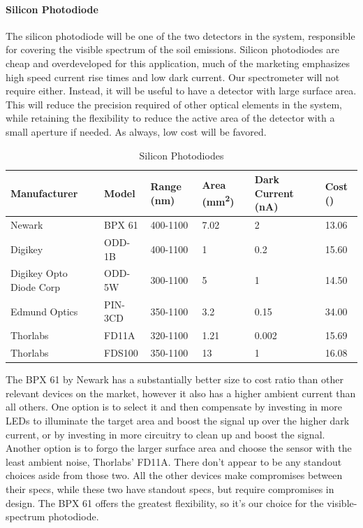 	\paragraph{Silicon Photodiode}

	The silicon photodiode will be one of the two detectors in the system, responsible for covering the visible spectrum of the soil emissions. Silicon photodiodes are cheap and overdeveloped for this application, much of the marketing emphasizes high speed current rise times and low dark current. Our spectrometer will not require either. Instead, it will be useful to have a detector with large surface area. This will reduce the precision required of other optical elements in the system, while retaining the flexibility to reduce the active area of the detector with a small aperture if needed. As always, low cost will be favored.


\begin{table}[H]
	\centering
	\label{table:SiliconPhotodiodes}
	\caption{Silicon Photodiodes}
	\bigskip
	\begin{tabular}{|p{2.5cm}|p{2cm}|p{2cm}|p{1.5cm}|p{1.5cm}|p{1.5cm}|}
	\hline
	Manufacturer & Model & Range (nm) & Area (mm\textsuperscript{2}) & Dark Current (nA) & Cost (\textdollar)\\
    \hline
	Newark & BPX 61 & 400-1100 & 7.02 & 2 & 13.06\\
    \hline
	Digikey & ODD-1B & 400-1100 & 1 & 0.2 & 15.60\\
    \hline
	Digikey Opto Diode Corp & ODD-5W & 300-1100 & 5 & 1 & 14.50\\
    \hline
	Edmund Optics & PIN-3CD & 350-1100 & 3.2 & 0.15 & 34.00\\
    \hline
	Thorlabs & FD11A & 320-1100 & 1.21 & 0.002 & 15.69\\
    \hline
	Thorlabs & FDS100 & 350-1100 & 13 & 1 & 16.08\\
    \hline
	\end{tabular}
\end{table}


The BPX 61 by Newark has a substantially better size to cost ratio than other relevant devices on the market, however it also has a higher ambient current than all others. One option is to select it and then compensate by investing in more LEDs to illuminate the target area and boost the signal up over the higher dark current, or by investing in more circuitry to clean up and boost the signal. Another option is to forgo the larger surface area and choose the sensor with the least ambient noise, Thorlabs’ FD11A. There don’t appear to be any standout choices aside from those two. All the other devices make compromises between their specs, while these two have standout specs, but require compromises in design. The BPX 61 offers the greatest flexibility, so it’s our choice for the visible-spectrum photodiode.

